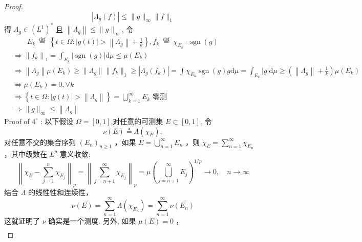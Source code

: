 \documentclass[lang=cn,newtx,10pt,scheme=chinese,thmcnt=chapter]{elegantbook}
\newcommand{\dif}{\mathrm{d}}
\begin{document}
\begin{proof}
\begin{equation*}
\left|\Lambda_g(f)\right| \leqslant\|g\|_{\infty}\|f\|_1
\end{equation*}
得 $\Lambda_g \in\left(L^1\right)^*$ 且 $\left\|\Lambda_g\right\| \leqslant\|g\|_{\infty}$, 令
\begin{equation*}
\begin{aligned}
& \qquad E_k \stackrel{\text { def }}{=}\left\{t \in \Omega:|g(t)|>\left\|\Lambda_g\right\|+\frac{1}{k}\right\}, f_k \stackrel{\text { def }}{=} \chi_{E_k} \cdot \operatorname{sgn}(g) \\
& \Rightarrow\left\|f_k\right\|_1=\int_{E_k}|\operatorname{sgn}(g)| \dif \mu \leqslant \mu\left(E_k\right) \\
& \Rightarrow\left\|\Lambda_g\right\| \mu\left(E_k\right) \geqslant\|\Lambda_g\|\|f_k\|_1 \geqslant\left|\Lambda_g\left(f_k\right)\right|=\int \chi_{E_k} \operatorname{sgn}(g) g \dif \mu=\int_{E_k}|g| \dif \mu \geqslant\left(\left\|\Lambda_g\right\|+\frac{1}{k}\right) \mu\left(E_k\right) \\
& \Rightarrow \mu\left(E_k\right)=0, \forall k \\
& \Rightarrow\left\{t \in \Omega:|g(t)|>\left\|\Lambda_g\right\|\right\}=\bigcup_{k=1}^{\infty} E_k \text { 零测 } \\
& \Rightarrow\|g\|_{\infty} \leqslant\left\|\Lambda_g\right\|
\end{aligned}
\end{equation*}
Proof of $4^{\circ}$ : 以下假设 $\Omega=[0,1]$,对任意的可测集 $E \subset[0,1]$, 令
\begin{equation*}
\nu(E) \triangleq \Lambda\left(\chi_E\right),
\end{equation*}
对任意不交的集合序列 $\left(E_n\right)_{n \geq 1}$ ，如果 $E=\bigcup_{n=1}^{\infty} E_n$ ，则 $\chi_E=\sum_{n=1}^{\infty} \chi_{E_n}$ ，其中级数在 $L^p$ 意义收敛:
\begin{equation*}
\left\|\chi_E-\sum_{j=1}^n \chi_{E_j}\right\|_p=\left\|\sum_{j=n+1}^{\infty} \chi_{E_j}\right\|_p=\mu\left(\bigcup_{j=n+1}^{\infty} E_j\right)^{1 / p} \rightarrow 0, \quad n \rightarrow \infty
\end{equation*}
结合 $\Lambda$ 的线性性和连续性，
\begin{equation*}
\nu(E)=\sum_{n=1}^{\infty} \Lambda\left(\chi_{E_n}\right)=\sum_{n=1}^{\infty} \nu\left(E_n\right)
\end{equation*}
这就证明了 $\nu$ 确实是一个测度. 另外, 如果 $\mu(E)=0$ ，
\begin{equation*}
\begin{aligned}

\end{aligned}
\end{equation*}
\end{proof}
\end{document}
